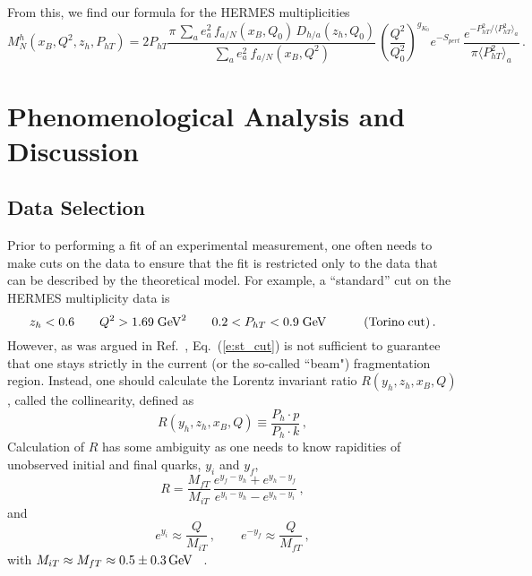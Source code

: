 \documentclass[final,3p,times,onecolumn,sort&compress,hidelinks]{elsarticle}
\newcommand\3[1]{\boldsymbol{#1}}
\begin{document}
From this, we find our formula for the HERMES multiplicities~\cite{Airapetian:2012ki} 
\begin{equation}
M_N^h(x_B, Q^2,z_h, P_{hT}) =
2P_{hT}\frac{\pi\, \sum_{a} e_a^2 \,f_{a/N}(x_B, Q_0)\,D_{h/a}(z_h, Q_0)}
{\sum_{a} e_a^2 \> f_{a/N} (x_B,Q^2)} \,  \left( \frac{Q^2}{Q_0^2}\right)^{g_{K_0}}e^{-S_{pert}}\,
\frac{e^{-P_{hT}^2/\langle P_{hT}^2 \rangle_a}}{\pi\langle P_{hT}^2 \rangle_a}
\,. \label{e:mult_HERMES}
\end{equation}


\section{Phenomenological Analysis and Discussion}
\label{s:phenom}

\subsection{Data Selection}
\label{s:data}
Prior to performing a fit of an experimental measurement, one often needs to make cuts on the data to ensure that the fit is restricted only to the data that can be described by the theoretical model.  For example, a ``standard'' cut on the HERMES multiplicity data is~\cite{Anselmino:2013lza}
\begin{equation}
z_h < 0.6 \quad\quad Q^2 > 1.69 \; \textrm{GeV}^2  
\quad\quad 0.2 < P_{hT} < 0.9 \; \textrm{GeV} \quad\quad\quad{\rm (Torino\;cut)}\,.\label{e:st_cut}
\end{equation}
However, as was argued in Ref.~\cite{Boglione:2016bph}, Eq.~(\ref{e:st_cut}) is not sufficient to guarantee that one stays strictly in the current (or the so-called ``beam") fragmentation region.  Instead, one should calculate the Lorentz invariant ratio $R(y_h,z_h,x_B,Q)$, called the collinearity, defined as~\cite{Boglione:2016bph}
\begin{equation}
R(y_h,z_h,x_B,Q)\equiv \frac{P_h\cdot p} {P_h\cdot k}\,,
\end{equation}
Calculation of $R$ has some ambiguity as one needs to know rapidities of unobserved initial and final quarks, $y_i$ and $y_f$,  
\begin{equation}
R = \frac{M_{fT}} {M_{iT}}\,\frac{e^{y_f-y_h}+e^{y_h-y_f}} {e^{y_i-y_h}-e^{y_h-y_i}}\,,
\end{equation}
and 
\begin{equation}
e^{y_i} \approx \frac{Q} {M_{iT}}\,,\quad\quad e^{-y_f} \approx \frac{Q} {M_{fT}}\,,
\end{equation}
with  $M_{iT} \approx M_{fT} \approx 0.5 \pm 0.3\,{\rm GeV}$ ~\cite{Boglione:2016bph}.
\end{document}
